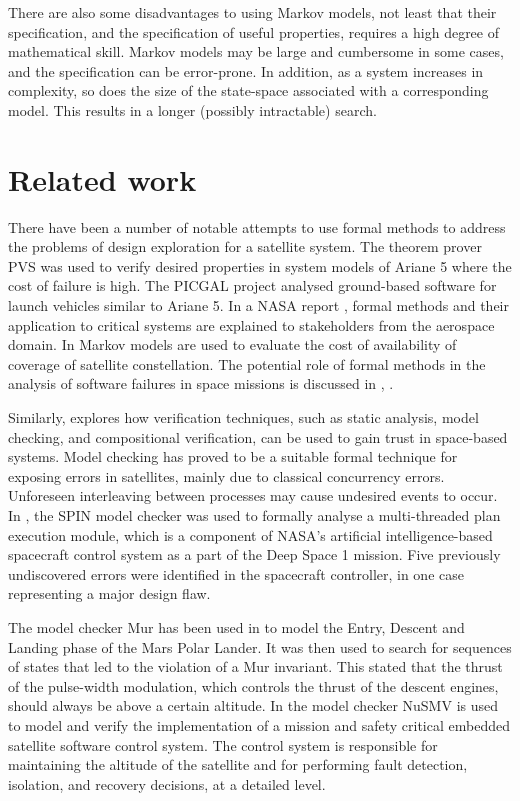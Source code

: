 \documentclass[preprint,12pt]{qrei}
\begin{document}
There are also some disadvantages to using Markov models, not least that their specification, and the specification of useful properties, requires a high degree of mathematical skill. Markov models may be large and cumbersome in some cases, and the specification can be error-prone. In addition, as a system increases in complexity, so does the size of the state-space associated with a corresponding model. This results in a longer (possibly intractable) search.



\section{Related work}
\label{sect:relatedWork}

There have been a number of notable attempts to use formal methods to address the problems of design exploration for a satellite system. The theorem prover PVS \cite{ORS92} was used to verify desired properties in system models of Ariane 5 where the cost of failure is high. The PICGAL project \cite{DLV97} analysed ground-based software for launch vehicles similar to Ariane 5. In a NASA report \cite{Rus97}, formal methods and their application to critical systems are explained to stakeholders from the aerospace domain. In \cite{CD04} Markov models are used to evaluate the cost of availability of coverage of satellite constellation. The potential role of formal methods in the analysis of software failures in space missions is discussed in \cite{Joh05}, .

Similarly, \cite{BDG+06} explores how verification techniques, such as static analysis, model checking, and compositional verification, can be used to gain trust in space-based systems. Model checking has proved to be a suitable formal technique for exposing errors in satellites, mainly due to classical concurrency errors. Unforeseen interleaving between processes may cause undesired events to occur. In \cite{HLP01}, the SPIN model checker \cite{Hol04} was used to formally analyse a multi-threaded plan execution module, which is a component of NASA's artificial intelligence-based spacecraft control system as a part of the Deep Space 1 mission. Five previously undiscovered errors were identified in the spacecraft controller, in one case representing a major design flaw.

The model checker Mur \cite{DDH+92} has been used in \cite{She01} to model the Entry, Descent and Landing phase of the Mars Polar Lander. It was then used to search for sequences of states that led to the violation of a Mur invariant. This stated that the thrust of the pulse-width modulation, which controls the thrust of the descent engines, should always be above a certain altitude. In \cite{GDH13} the model checker NuSMV \cite{CCG+02} is used to model and verify the implementation of a mission and safety critical embedded satellite software control system. The control system is responsible for maintaining the altitude of the satellite and for performing fault detection, isolation, and recovery decisions, at a detailed level.
\end{document}
